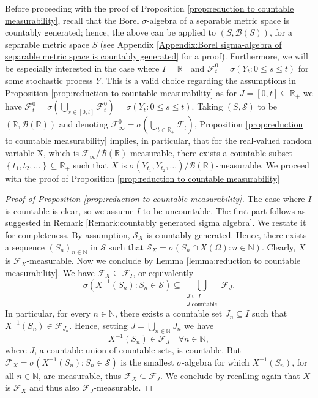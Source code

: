 \documentclass[11pt,a4paper,twoside,openany]{report}
\numberwithin{equation}{section}
\theoremstyle{plain} %
\theoremstyle{definition} %
\theoremstyle{remark} %
\begin{document}
 Before proceeding with the proof of Proposition \ref{prop:reduction to countable measurability}, recall that the Borel \(\sigma\)-algebra of a separable metric space is countably generated; hence, the above can be applied to \((S,\mathcal{B}(S))\), for a separable metric space \(S\) (see Appendix \ref{Appendix:Borel sigma-algebra of separable metric space is countably generated} for a proof).
 Furthermore, we will be especially interested in the case where \(I=\mathbb{R}_+\) and \(\mathcal{F}^0_t=\sigma(Y_t:0\leq s\leq t)\) for some stochastic process \(Y\). This is a valid choice regarding the assumptions in Proposition \ref{prop:reduction to countable measurability} as for \(J=[0,t]\subseteq\mathbb{R}_+\) we have \(\mathcal{F}^0_t=\sigma(\bigcup_{s\in[0,t]}\mathcal{F}^0_t)=\sigma(Y_t:0\leq s\leq t)\). Taking \((S,\mathcal{S})\) to be \((\mathbb{R},\mathcal{B}(\mathbb{R}))\) and denoting \(\mathcal{F}^0_{\infty}=
\sigma(\bigcup_{t\in\mathbb{R}_+}\mathcal{F}_t)\),  Proposition \ref{prop:reduction to countable measurability} implies, in particular, that for the real-valued random variable X, which is \(\mathcal{F}_{\infty}/\mathcal{B}(\mathbb{R})\)-measurable, there exists a countable subset \(\left\{t_1,t_2,\dots\right\}\subseteq\mathbb{R}_+\) such that \(X\) is \(\sigma(Y_{t_1},Y_{t_2},\dots)/\mathcal{B}(\mathbb{R})\)-measurable.
 We proceed with the proof of Proposition \ref{prop:reduction to countable measurability}
 \begin{proof}[Proof of Proposition \ref{prop:reduction to countable measurability}]
 The case where \(I\) is countable is clear, so we assume \(I\) to be uncountable.
 The first part follows as suggested in Remark \ref{Remark:countably generated sigma algebra}. We restate it for completeness. By assumption, \(\mathcal{S}_X\) is countably generated. Hence, there exists a sequence \((S_n)_{n\in\mathbb{N}}\) in \(\mathcal{S}\) such that \(\mathcal{S}_X=\sigma(S_n\cap X(\Omega):n\in\mathbb{N})\). 
 Clearly, \(X\) is \(\mathcal{F}_X\)-measurable. Now we conclude by Lemma \ref{lemma:reduction to countable measurability}. We have \(\mathcal{F}_X\subseteq\mathcal{F}_I\), or equivalently
 \begin{equation*}
     \sigma(X^{-1}(S_n):S_n\in\mathcal{S})\subseteq\bigcup_{\substack{J\subseteq I\\ J\text{ countable}}}\mathcal{F}_J.
 \end{equation*}
 In particular, for every \(n\in\mathbb{N}\), there exists a countable set \(J_n\subseteq I\) such that
 \(X^{-1}(S_n)\in \mathcal{F}_{J_n}\). Hence, setting \(J=\bigcup_{n\in\mathbb{N}}J_n\) we have 
 \begin{equation*}
     X^{-1}(S_n)\in\mathcal{F}_J\quad\forall n\in\mathbb{N},
 \end{equation*}
 where \(J\), a countable union of countable sets, is countable.
 But \(\mathcal{F}_X=\sigma(X^{-1}(S_n):S_n\in\mathcal{S})\) is the smallest \(\sigma\)-algebra for which \(X^{-1}(S_n)\), for all \(n\in\mathbb{N}\), are measurable, thus \(\mathcal{F}_X\subseteq \mathcal{F}_J\). We conclude by recalling again that \(X\) is \(\mathcal{F}_X\) and thus also \(\mathcal{F}_J\)-measurable.
   \end{proof}
\end{document}
